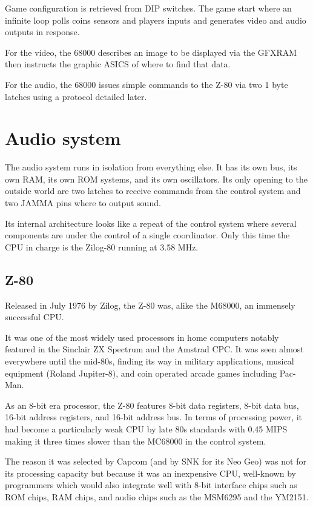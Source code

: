 Game configuration is retrieved from DIP switches. The game start where an infinite loop polls coins sensors and players inputs and generates video and audio outputs in response. 

For the video, the 68000 describes an image to be displayed via the GFXRAM then instructs the graphic ASICS of where to find that data. 

For the audio, the 68000 issues simple commands to the Z-80 via two 1 byte latches using a protocol detailed later.
  











\pagebreak
\section{Audio system}
The audio system runs in isolation from everything else. It has its own bus, its own RAM, its own ROM systems, and its own oscillators. Its only opening to the outside world are two latches to receive commands from the control system and two JAMMA pins where to output sound.

Its internal architecture looks like a repeat of the control system where several components are under the control of a single coordinator. Only this time the CPU in charge is the Zilog-80 running at 3.58 MHz.

\subsection{Z-80}
Released in July 1976 by Zilog, the Z-80 was, alike the M68000, an immensely successful CPU. 

It was one of the most widely used processors in home computers notably featured in the Sinclair ZX Spectrum and the Amstrad CPC. It was seen almost everywhere until the mid-80s, finding its way in military applications, musical equipment (Roland Jupiter-8), and coin operated arcade games including Pac-Man. 

As an 8-bit era processor, the Z-80 features 8-bit data registers, 8-bit data bus, 16-bit address registers, and 16-bit address bus. In terms of processing power, it had become a particularly weak CPU by late 80s standards with 0.45 MIPS making it three times slower than the MC68000 in the control system. 

The reason it was selected by Capcom (and by SNK for its Neo Geo) was not for its processing capacity but because it was an inexpensive CPU, well-known by programmers which would also integrate well with 8-bit interface chips such as ROM chips, RAM chips, and audio chips such as the MSM6295 and the YM2151.

